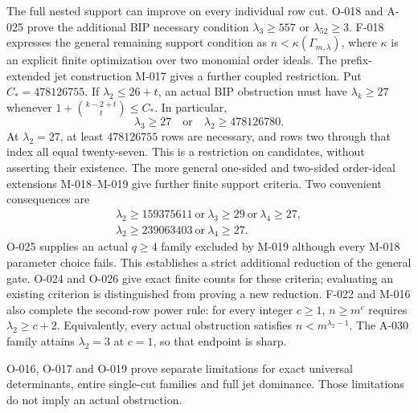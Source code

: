 The full nested support can improve on every individual row cut.
O-018 and A-025 prove the additional BIP necessary condition
\(\lambda_3\geq557\) or \(\lambda_{52}\geq3\).
F-018 expresses the general remaining support condition as
\(n<\kappa(\Gamma_{m,\lambda})\), where \(\kappa\) is an
explicit finite optimization over two monomial order ideals.
The prefix-extended jet construction M-017 gives a further
coupled restriction. Put \(C_*=478126755\). If
\(\lambda_2\leq26+t\), an actual BIP obstruction must have
\(\lambda_k\geq27\) whenever
\(1+\binom{k-2+t}{t}\leq C_*\). In particular,
\[
 \lambda_3\geq27\quad\text{or}\quad\lambda_2\geq478126780.
\]
At \(\lambda_2=27\), at least \(478126755\) rows are
necessary, and rows two through that index all equal twenty-seven.
This is a restriction on candidates, without asserting their existence.
The more general one-sided and two-sided order-ideal extensions
M-018--M-019 give further finite support criteria. Two convenient
consequences are
\[
 \begin{gathered}
 \lambda_2\geq159375611\ \text{or}\ \lambda_3\geq29
                         \ \text{or}\ \lambda_4\geq27,\\
 \lambda_2\geq239063403\ \text{or}\ \lambda_4\geq27.
 \end{gathered}
\]
O-025 supplies an actual \(q\geq4\) family excluded by M-019
although every M-018 parameter choice fails. This establishes a
strict additional reduction of the general gate. O-024 and O-026
give exact finite counts for these criteria; evaluating an existing
criterion is distinguished from proving a new reduction.
F-022 and M-016 also complete the second-row power rule:
for every integer \(c\geq1\), \(n\geq m^c\) requires
\(\lambda_2\geq c+2\). Equivalently, every actual obstruction
satisfies \(n<m^{\lambda_2-1}\).
The A-030 family attains \(\lambda_2=3\) at \(c=1\),
so that endpoint is sharp.

O-016, O-017 and O-019 prove separate limitations for exact
universal determinants, entire single-cut families and full jet
dominance. Those limitations do not imply an actual obstruction.

